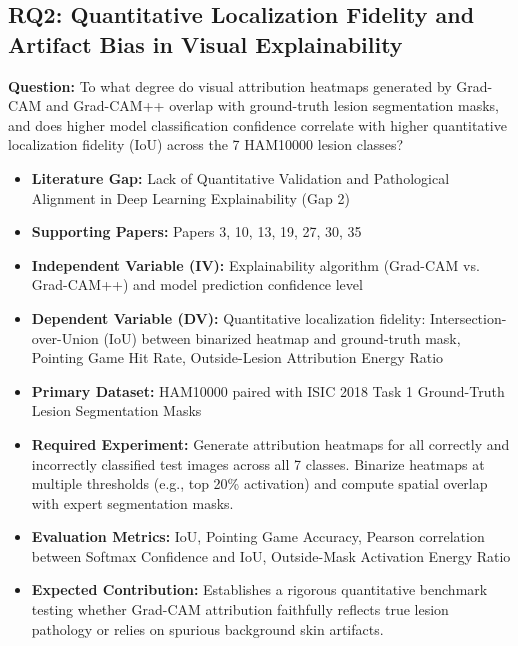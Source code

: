 \documentclass[11pt,a4paper]{article}
\begin{document}
\subsection{RQ2: Quantitative Localization Fidelity and Artifact Bias in Visual Explainability}
\textbf{Question:} To what degree do visual attribution heatmaps generated by Grad-CAM and Grad-CAM++ overlap with ground-truth lesion segmentation masks, and does higher model classification confidence correlate with higher quantitative localization fidelity (IoU) across the 7 HAM10000 lesion classes?
\begin{itemize}
\item \textbf{Literature Gap:} Lack of Quantitative Validation and Pathological Alignment in Deep Learning Explainability (Gap 2)
\item \textbf{Supporting Papers:} Papers 3, 10, 13, 19, 27, 30, 35
\item \textbf{Independent Variable (IV):} Explainability algorithm (Grad-CAM vs. Grad-CAM++) and model prediction confidence level
\item \textbf{Dependent Variable (DV):} Quantitative localization fidelity: Intersection-over-Union (IoU) between binarized heatmap and ground-truth mask, Pointing Game Hit Rate, Outside-Lesion Attribution Energy Ratio
\item \textbf{Primary Dataset:} HAM10000 paired with ISIC 2018 Task 1 Ground-Truth Lesion Segmentation Masks
\item \textbf{Required Experiment:} Generate attribution heatmaps for all correctly and incorrectly classified test images across all 7 classes. Binarize heatmaps at multiple thresholds (e.g., top 20\% activation) and compute spatial overlap with expert segmentation masks.
\item \textbf{Evaluation Metrics:} IoU, Pointing Game Accuracy, Pearson correlation between Softmax Confidence and IoU, Outside-Mask Activation Energy Ratio
\item \textbf{Expected Contribution:} Establishes a rigorous quantitative benchmark testing whether Grad-CAM attribution faithfully reflects true lesion pathology or relies on spurious background skin artifacts.
\end{itemize}
\end{document}
